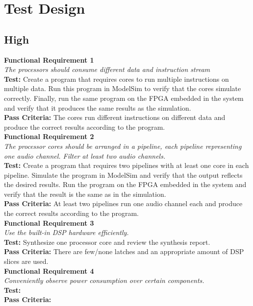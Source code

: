 \section{Test Design}

\subsection{High}

\textbf{Functional Requirement 1}
\\
\textit{The processors should consume different data and instruction stream}
\\
\textbf{Test:}
Create a program that requires cores to run multiple instructions on multiple data. 
Run this program in ModelSim to verify that the cores simulate correctly. 
Finally, run the same program on the FPGA embedded in the system and verify that it produces the same results as the simulation.
\\
\textbf{Pass Criteria:}
The cores run different instructions on different data and produce the correct results according to the program. 
\\

\textbf{Functional Requirement 2}
\\
\textit{The processor cores should be arranged in a pipeline, each pipeline representing one audio channel. Filter at least two audio channels.}
\\
\textbf{Test:}
Create a program that requires two pipelines with at least one core in each pipeline. 
Simulate the program in ModelSim and verify that the output reflects the desired results.
Run the program on the FPGA embedded in the system and verify that the result is the same as in the simulation.
\\
\textbf{Pass Criteria:}
At least two pipelines run one audio channel each and produce the correct results according to the program.
\\

\textbf{Functional Requirement 3}
\\
\textit{Use the built-in DSP hardware efficiently.}
\\
\textbf{Test:}
Synthesize one processor core and review the synthesis report. 
\\ 
\textbf{Pass Criteria:}
There are few/none latches and an appropriate amount of DSP slices are used.
\\

\textbf{Functional Requirement 4}
\\
\textit{Conveniently observe power consumption over certain components.}
\\
\textbf{Test:}
\\
\textbf{Pass Criteria:}
\\


